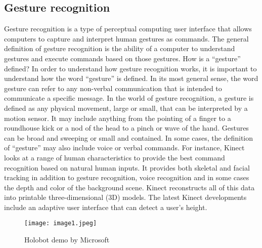 \documentclass[12pt,a4paper]{article}
\begin{document}
\subsection{Gesture recognition}
\par Gesture recognition is a type of perceptual computing user interface that allows computers to capture and interpret human gestures as commands. The general definition of gesture recognition is the ability of a computer to understand gestures and execute commands based on those gestures. 
How is a “gesture” defined?
In order to understand how gesture recognition works, it is important to understand how the word “gesture” is defined. In its most general sense, the word gesture can refer to any non-verbal communication that is intended to communicate a specific message. In the world of gesture recognition, a gesture is defined as any physical movement, large or small, that can be interpreted by a motion sensor. It may include anything from the pointing of a finger to a roundhouse kick or a nod of the head to a pinch or wave of the hand. Gestures can be broad and sweeping or small and contained. In some cases, the definition of “gesture” may also include voice or verbal commands.
For instance, Kinect looks at a range of human characteristics to provide the best command recognition based on natural human inputs. It provides both skeletal and facial tracking in addition to gesture recognition, voice recognition and in some cases the depth and color of the background scene. Kinect reconstructs all of this data into printable three-dimensional (3D) models. The latest Kinect developments include an adaptive user interface that can detect a user’s height.

\begin{figure}[h]
	\centering
	\texttt{[image: image1.jpeg]}
	\caption{Holobot demo by Microsoft}
\end{figure}
\end{document}

